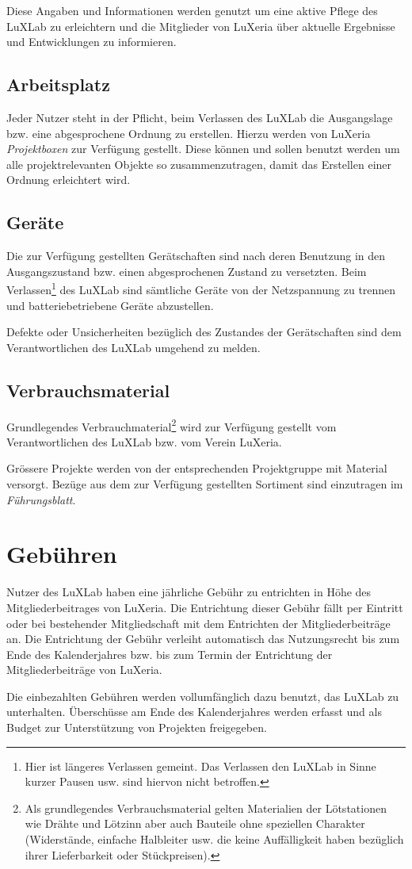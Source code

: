 \documentclass[a4paper,
               10pt,
               fleqn]{article}
\begin{document}
Diese Angaben und Informationen werden genutzt um eine aktive Pflege des
LuXLab zu erleichtern und die Mitglieder von LuXeria über aktuelle
Ergebnisse und Entwicklungen zu informieren.

\subsection{Arbeitsplatz}
Jeder Nutzer steht in der Pflicht, beim Verlassen des LuXLab die
Ausgangslage bzw. eine abgesprochene Ordnung zu erstellen. Hierzu
werden von LuXeria \emph{Projektboxen} zur Verfügung gestellt. Diese
können und sollen benutzt werden um alle projektrelevanten Objekte 
so zusammenzutragen, damit das Erstellen einer Ordnung erleichtert wird.
 
\subsection{Geräte}
Die zur Verfügung gestellten Gerätschaften sind nach deren Benutzung in
den Ausgangszustand bzw. einen abgesprochenen Zustand zu versetzten.
Beim Verlassen\footnote{
    Hier ist längeres Verlassen gemeint. Das Verlassen den LuXLab in 
    Sinne kurzer Pausen usw. sind hiervon nicht betroffen.}
des LuXLab sind sämtliche Geräte von der Netzspannung zu trennen und 
batteriebetriebene Geräte abzustellen.

Defekte oder Unsicherheiten bezüglich des Zustandes der Gerätschaften 
sind dem Verantwortlichen des LuXLab umgehend zu melden.

\subsection{Verbrauchsmaterial}
Grundlegendes Verbrauchmaterial\footnote{
    Als grundlegendes Verbrauchsmaterial gelten Materialien der
    Lötstationen wie Drähte und Lötzinn aber auch Bauteile ohne
    speziellen Charakter (Widerstände, einfache Halbleiter usw. 
    die keine Auffälligkeit haben bezüglich ihrer Lieferbarkeit
    oder Stückpreisen).}
wird zur Verfügung gestellt vom Verantwortlichen des LuXLab bzw.
vom Verein LuXeria.

Grössere Projekte werden von der entsprechenden Projektgruppe
mit Material versorgt. Bezüge aus dem zur Verfügung gestellten 
Sortiment sind einzutragen im \emph{Führungsblatt}.

\section{Gebühren}
\label{gebuehren}
Nutzer des LuXLab haben eine jährliche Gebühr zu entrichten in
Höhe des Mitgliederbeitrages von LuXeria.
Die Entrichtung dieser Gebühr fällt per Eintritt oder bei
bestehender Mitgliedschaft mit dem Entrichten der
Mitgliederbeiträge an. Die Entrichtung der Gebühr verleiht
automatisch das Nutzungsrecht bis zum Ende des Kalenderjahres
bzw. bis zum Termin der Entrichtung der Mitgliederbeiträge 
von LuXeria.

Die einbezahlten Gebühren werden vollumfänglich dazu benutzt, 
das LuXLab zu unterhalten. Überschüsse am Ende des Kalenderjahres 
werden erfasst und als Budget zur Unterstützung von Projekten
freigegeben.

\end{document}
